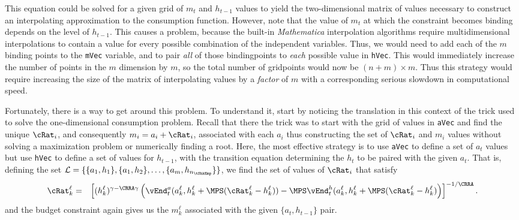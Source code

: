 \documentclass[titlepage]{\econtex}
\newcommand{\Mma}{\textit{Mathematica}}
\begin{document}
{  This equation could be solved for a given grid of ${m}_{t}$ and
  $h_{t-1}$ values to yield the two-dimensional matrix of values
  necessary to construct an interpolating approximation to the
  consumption function.  However, note that the value of ${m}_{t}$ at
  which the constraint becomes binding depends on the level of
  $h_{t-1}$.  This causes a problem, because the built-in {\Mma}
  interpolation algorithms require multidimensional interpolations to
  contain a value for every possible combination of the independent
  variables.  Thus, we would need to add each of the $m$ binding
  points to the \texttt{mVec} variable, and to pair \textit{all} of
  those bindingpoints to \textit{each} possible value in \texttt{hVec}.
  This would immediately increase the number of points in the ${m}$
  dimension by $m$, so the total number of gridpoints would now be
  $(n+m) \times m$.  Thus this strategy would require increasing the
  size of the matrix of interpolating values by a \textit{factor} of $m$
  with a corresponding serious slowdown in computational speed.

  Fortunately, there is a way to get around this problem.  To
  understand it, start by noticing the translation in this context of
  the trick used to solve the one-dimensional consumption problem.
  Recall that there the trick was to start with the grid of values in
  \texttt{aVec} and find the unique ${\cRat}_{i}$, and
  consequently ${m}_{i}={a}_{i}+{\cRat}_{i}$, associated with
  each ${a}_{i}$ thus constructing the set of ${\cRat}_{i}$ and
  ${m}_{i}$ values without solving a maximization problem or
  numerically finding a root.  Here, the most effective strategy is to
  use \texttt{aVec} to define a set of ${a}_{t}$ values but use
  \texttt{hVec} to define a set of values for $h_{t-1}$, with the
  transition equation determining the $h_{t}$ to be paired with the
  given ${a}_{t}$.  That is, defining the set $\mathcal{L} =
  \{\{{a}_{1},h_{1}\},\{{a}_{1},h_{2}\},\ldots,\{{a}_{m},h_{n_{\tShkEmp}}\}\}$,
  we find the set of values of ${\cRat}_{i}$ that satisfy
  \begin{eqnarray}
    {\cRat}_{k}^{\ell} & = & \left[(h_{k}^{\ell})^{\gamma-\CRRA\gamma}
                             \left(\vEnd_{t}^{{a}}({a}_{k}^{\ell},h_{k}^{\ell}
                             +\MPS({\cRat}_{k}^{\ell}-h_{k}^{\ell}))
                             -\MPS
                             \vEnd_{t}^{h}({a}_{k}^{\ell},h_{k}^{\ell}+\MPS({\cRat}_{k}^{\ell}-h_{k}^{\ell})\right)
                             \right]^{-1/\CRRA}. \nonumber
  \end{eqnarray}
  and the budget constraint again gives us the ${m}_{k}^{\ell}$
  associated with the given $\{{a}_{t},h_{t-1}\}$ pair.

}
\end{document}
